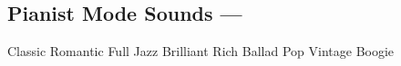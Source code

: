\subsection{Pianist Mode Sounds --- }
Classic
Romantic
Full
Jazz
Brilliant
Rich
Ballad
Pop
Vintage
Boogie
